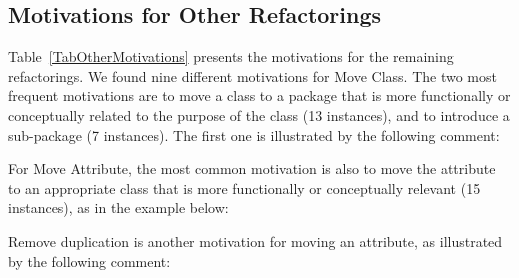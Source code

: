 \subsection{Motivations for Other Refactorings}
\label{sec:other:motivations}


Table~\ref{TabOtherMotivations} presents the motivations for the remaining refactorings.
We found nine different motivations for {\textsc Move Class}.
The two most frequent motivations are to move a class to a package that is more functionally or conceptually related to 
the purpose of the class (13 instances), and to introduce a sub-package (7 instances). The first one is illustrated by the following comment:\margin


\margin




For {\textsc Move Attribute}, the most common motivation is also to move the attribute to an 
appropriate class that is more functionally or conceptually relevant (15 instances), as in the 
example below:\margin

\margin

Remove duplication is another motivation for moving an attribute, as illustrated by the following 
comment:\margin

\margin


